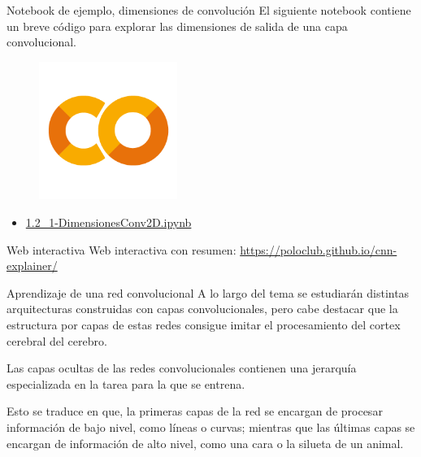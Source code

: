 \begin{frame}{Notebook de ejemplo, dimensiones de convolución}
El siguiente notebook contiene un breve código para explorar las \alert{dimensiones de salida} de una capa convolucional.

\begin{figure}
    \centering
    \includegraphics[width=0.4\textwidth]{Slides/figures/GoogleColab.png}
\end{figure}
\begin{itemize}
    \centering
    \item {\Large \href{https://colab.research.google.com/drive/1UpvEAbh6kwSScuOJjf7228ZA5lWCHihO?usp=sharing}{1.2\_1-DimensionesConv2D.ipynb}}
\end{itemize}
\end{frame}

\begin{frame}{Web interactiva}
Web interactiva con resumen: \href{https://poloclub.github.io/cnn-explainer/}{https://poloclub.github.io/cnn-explainer/}
\end{frame}

\begin{frame}{Aprendizaje de una red convolucional}
A lo largo del tema se estudiarán distintas \alert{arquitecturas} construidas con capas convolucionales, pero cabe destacar que la \alert{estructura por capas} de estas redes consigue \alert{imitar} el procesamiento del \alert{cortex cerebral} del cerebro.

Las capas \alert{ocultas} de las redes convolucionales contienen una \alert{jerarquía} especializada en la tarea para la que se entrena.

Esto se traduce en que, la \alert{primeras} capas de la red se encargan de procesar información de \alert{bajo nivel}, como \alert{líneas} o \alert{curvas}; mientras que las \alert{últimas} capas se encargan de información de \alert{alto nivel}, como una cara o la silueta de un animal.
\end{frame}

